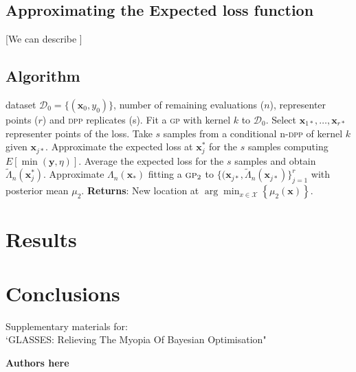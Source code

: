 \documentclass{article} %
\newcommand{\bx}{\textbf{x}}
\newcommand{\by}{\textbf{y}}
\newcommand{\acr}[1]{\textsc{#1}\xspace}
\newcommand{\gp}{\acr{gp}}
\newcommand{\dpp}{\acr{dpp}}
\newcommand{\us}{\acr{glasses}}
\begin{document}
\subsection{Approximating the Expected loss function}

[We can describe ]

\subsection{Algorithm}


\begin{algorithm}[t!]
   \caption{Decision process of the \us algorithm.}
   \label{alg:glasses}
\begin{algorithmic}
    dataset $\mathcal{D}_{0} = \{(\textbf{x}_0, y_0)\}$, number of remaining evaluations ($n$), representer points ($r$) and \dpp replicates (s).
\STATE
   \STATE Fit a \gp with kernel $k$ to $\mathcal{D}_{0}$.
   \STATE Select $\bx_{1*},\dots,\bx_{r*}$ representer points of the loss.
   \STATE Take $s$ samples from a conditional n-\dpp of kernel $k$ given $\bx_{j*}$.
   \STATE Approximate the expected loss at $\bx_j^*$ for the $s$ samples computing $E [\min (\by,\eta)]$.
  \STATE Average the expected loss for the $s$ samples and obtain $\tilde{\Lambda}_n(\bx_j^*)$.
   \ENDFOR
\STATE Approximate $\Lambda_n(\bx_*)$ fitting a $\gp_2$  to $\{(\bx_{j*}, \tilde{\Lambda}_n(\bx_{j*})\}_{j=1}^r$ with posterior mean $\mu_2$.
   \STATE \textbf{Returns}: New location at $\arg \min_{x \in \mathcal{X}} \left\{\mu_2(\bx)\right\}$.  
\end{algorithmic}
\end{algorithm}

\section{Results}


\section{Conclusions}




\clearpage
\setcounter{section}{0}
\setcounter{equation}{0}
\renewcommand{\thesection}{S\arabic{section}}
\renewcommand{\theequation}{S.\arabic{equation}}

\begin{center}
{\LARGE  Supplementary materials for:\\
`GLASSES: Relieving The Myopia Of Bayesian Optimisation"}
\end{center}
\begin{center}
\textbf{Authors here}
\end{center}
\end{document}
